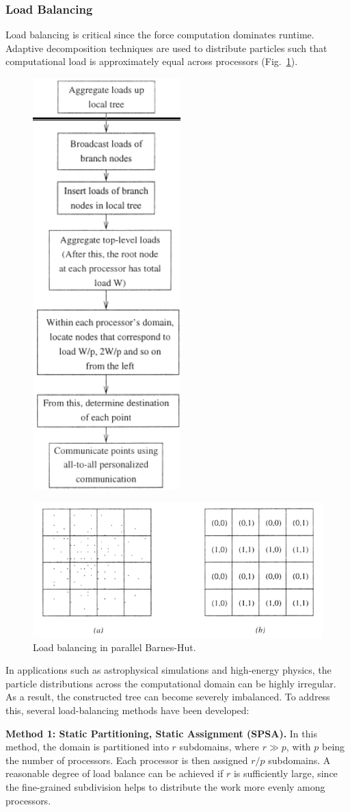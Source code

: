 \documentclass[12pt]{book}
\begin{document}
\subsubsection{Load Balancing}
Load balancing is critical since the force computation dominates runtime. Adaptive decomposition techniques are used to distribute particles such that computational load is approximately equal across processors (Fig.~\ref{fig:loadbalancing}).
\begin{figure}[ht]
    \centering
    \includegraphics[width=0.25\linewidth]{images/schematicloadbalanc.png}
\end{figure}
\begin{figure}[ht]
    \centering
    \includegraphics[width=0.5\linewidth]{images/loadbalancingnbody.png}
    \caption{Load balancing in parallel Barnes-Hut.}
    \label{fig:loadbalancing}
\end{figure}

In applications such as astrophysical simulations and high-energy physics, the particle distributions across the computational domain can be highly irregular. As a result, the constructed tree can become severely imbalanced. To address this, several load-balancing methods have been developed:

\textbf{Method 1: Static Partitioning, Static Assignment (SPSA).}  
In this method, the domain is partitioned into $r$ subdomains, where $r \gg p$, with $p$ being the number of processors. Each processor is then assigned $r/p$ subdomains. A reasonable degree of load balance can be achieved if $r$ is sufficiently large, since the fine-grained subdivision helps to distribute the work more evenly among processors.
\end{document}

